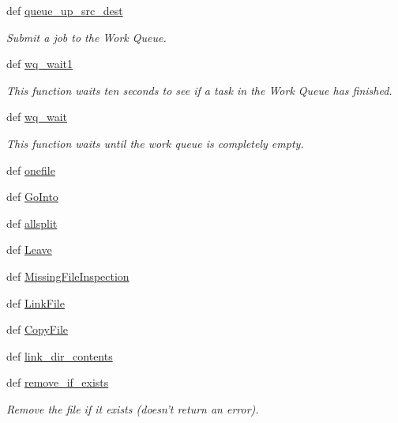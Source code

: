 \begin{DoxyCompactItemize}
def \hyperlink{namespaceforcebalance_1_1nifty_a5d5abeb4a185fde64721d044831e18ee}{queue\-\_\-up\-\_\-src\-\_\-dest}
\begin{DoxyCompactList}\small\item\em Submit a job to the Work Queue. \end{DoxyCompactList}\item 
def \hyperlink{namespaceforcebalance_1_1nifty_a374aac2ef003be02fab49b20ff0a82f0}{wq\-\_\-wait1}
\begin{DoxyCompactList}\small\item\em This function waits ten seconds to see if a task in the Work Queue has finished. \end{DoxyCompactList}\item 
def \hyperlink{namespaceforcebalance_1_1nifty_a576de8c5b6f236280e07e73e39b2ab7c}{wq\-\_\-wait}
\begin{DoxyCompactList}\small\item\em This function waits until the work queue is completely empty. \end{DoxyCompactList}\item 
def \hyperlink{namespaceforcebalance_1_1nifty_ab5417ad84c6c760965cd195c6c387914}{onefile}
\item 
def \hyperlink{namespaceforcebalance_1_1nifty_ad432b88307e1178b0690c0d350b1af36}{Go\-Into}
\item 
def \hyperlink{namespaceforcebalance_1_1nifty_ac9ab6c5543a2e3080061e0024850edf3}{allsplit}
\item 
def \hyperlink{namespaceforcebalance_1_1nifty_ab04e8690d099db2379dc860e0d040120}{Leave}
\item 
def \hyperlink{namespaceforcebalance_1_1nifty_ae87c7def5f8edf2ec30737bdb1d2636f}{Missing\-File\-Inspection}
\item 
def \hyperlink{namespaceforcebalance_1_1nifty_ab182a9da2a2f42cf45942fbee6acf9b1}{Link\-File}
\item 
def \hyperlink{namespaceforcebalance_1_1nifty_af5f0e1ba7689f1ab40383ba0480560a9}{Copy\-File}
\item 
def \hyperlink{namespaceforcebalance_1_1nifty_a0cf4e58f90acf20e3d6224be2354082c}{link\-\_\-dir\-\_\-contents}
\item 
def \hyperlink{namespaceforcebalance_1_1nifty_a25efa4d501ad852a234721af18978f7e}{remove\-\_\-if\-\_\-exists}
\begin{DoxyCompactList}\small\item\em Remove the file if it exists (doesn't return an error). \end{DoxyCompactList}\item 

\end{DoxyCompactItemize}
